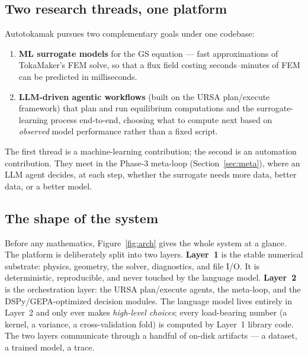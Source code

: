 \documentclass[11pt]{article}
\begin{document}
\subsection{Two research threads, one platform}
Autotokamak pursues two complementary goals under one codebase:
\begin{enumerate}[leftmargin=*]
  \item \textbf{ML surrogate models} for the GS equation --- fast approximations of TokaMaker's
  FEM solve, so that a flux field costing seconds--minutes of FEM can be predicted in
  milliseconds.
  \item \textbf{LLM-driven agentic workflows} (built on the URSA plan/execute framework) that
  plan and run equilibrium computations and the surrogate-learning process end-to-end, choosing
  what to compute next based on \emph{observed} model performance rather than a fixed script.
\end{enumerate}
The first thread is a machine-learning contribution; the second is an automation contribution.
They meet in the Phase-3 meta-loop (Section~\ref{sec:meta}), where an LLM agent decides, at each
step, whether the surrogate needs more data, better data, or a better model.

\subsection{The shape of the system}
Before any mathematics, Figure~\ref{fig:arch} gives the whole system at a glance. The platform is
deliberately split into two layers. \textbf{Layer~1} is the stable numerical substrate: physics,
geometry, the solver, diagnostics, and file I/O. It is deterministic, reproducible, and never
touched by the language model. \textbf{Layer~2} is the orchestration layer: the URSA plan/execute
agents, the meta-loop, and the DSPy/GEPA-optimized decision modules. The language model lives
entirely in Layer~2 and only ever makes \emph{high-level choices}; every load-bearing number
(a kernel, a variance, a cross-validation fold) is computed by Layer~1 library code. The two
layers communicate through a handful of on-disk artifacts --- a dataset, a trained model, a trace.
\end{document}
